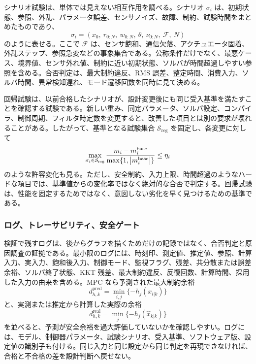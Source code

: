 シナリオ試験は、単体では見えない相互作用を調べる。シナリオ $\sigma_i$ は、初期状態、参照、外乱、パラメータ誤差、センサノイズ、故障、制約、試験時間をまとめたものであり、
\begin{equation}
  \sigma_i=
  (x_0,\ r_{0:N},\ w_{0:N},\ \theta,\ \nu_{0:N},\ \mathcal{F},\ N)
\end{equation}
のように表せる。ここで $\mathcal{F}$ は、センサ飽和、通信欠落、アクチュエータ固着、外乱ステップ、参照急変などの事象集合である。公称条件だけでなく、最悪ケース、境界値、センサ外れ値、制約に近い初期状態、ソルバが時間超過しやすい参照を含める。合否判定は、最大制約違反、RMS 誤差、整定時間、消費入力、ソルバ時間、異常検知遅れ、モード遷移回数を同時に見て決める。

回帰試験は、以前合格したシナリオが、設計変更後にも同じ受入基準を満たすことを確認する試験である。新しい重み、同定パラメータ、ソルバ設定、コンパイラ、制御周期、フィルタ時定数を変更すると、改善した項目とは別の要求が壊れることがある。したがって、基準となる試験集合 $\mathcal{S}_{\mathrm{reg}}$ を固定し、各変更に対して
\begin{equation}
  \max_{\sigma_i\in\mathcal{S}_{\mathrm{reg}}}
  \frac{m_i-m_i^{\mathrm{base}}}
       {\max\{1,\left|m_i^{\mathrm{base}}\right|\}}
  \le \eta_i
\end{equation}
のような許容変化も見る。ただし、安全制約、入力上限、時間超過のようなハードな項目では、基準値からの変化率ではなく絶対的な合否で判定する。回帰試験は、性能を固定するためではなく、意図しない劣化を早く見つけるための基準である。

\subsubsection{ログ、トレーサビリティ、安全ゲート}

検証で残すログは、後からグラフを描くためだけの記録ではなく、合否判定と原因調査の証拠である。最小限のログには、時刻印、測定値、推定値、参照、計算入力、実入力、飽和後入力、制御モード、監視フラグ、残差、共分散または誤差余裕、ソルバ終了状態、KKT 残差、最大制約違反、反復回数、計算時間、採用した入力の由来を含める。MPC なら予測された最大制約余裕
\begin{equation}
  d_{h,k}^{\mathrm{pred}}
  =
  \min_{i,j}\{-h_j(x_{i|k})\}
\end{equation}
と、実測または推定から計算した実際の余裕
\begin{equation}
  d_{h,k}^{\mathrm{real}}
  =
  \min_j\{-h_j(\hat{x}_{k|k})\}
\end{equation}
を並べると、予測が安全余裕を過大評価していないかを確認しやすい。ログには、モデル、制御器パラメータ、試験シナリオ、受入基準、ソフトウェア版、設定値の識別子も付ける。同じ入力と同じ設定から同じ判定を再現できなければ、合格と不合格の差を設計判断へ戻せない。

